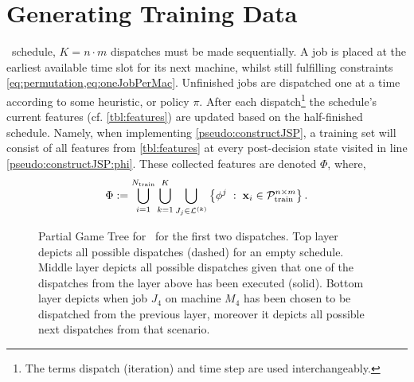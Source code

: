 
\chapter{Generating Training Data}\label{ch:gentrdat} 

 \jsp\ schedule, $K=n\cdot m$ 
dispatches must be made sequentially.
A job is placed at the earliest available time slot for its next machine, 
whilst still fulfilling constraints \cref{eq:permutation,eq:oneJobPerMac}.
Unfinished jobs are dispatched one at a time according to some heuristic, or 
policy $\pi$. 
After each dispatch\footnote{The terms dispatch (iteration) and time step are 
    used interchangeably.} the schedule's current features (cf. 
\cref{tbl:features}) are updated based on the half-finished schedule. Namely, 
when implementing \cref{pseudo:constructJSP}, a training set will consist of 
all features from \cref{tbl:features} at every post-decision state visited in 
line \ref{pseudo:constructJSP:phi}. 
These collected features are denoted $\Phi$, where, 
\begin{equation}\label{eq:Phi}
\Phi:= \bigcup_{i=1}^{N_{\train}} 
\bigcup_{k=1}^K\bigcup_{J_j\in\mathcal{L}^{(k)}} 
\condset{\vphi^j}{\vec{x}_i\in\mathcal{P}^{n\times m}_{\train} }.
\end{equation}

\begin{figure}[p]
    \vspace{-12pt}
    
    \vspace{-27pt}
    \caption[Partial Game Tree for \jsp]{Partial Game Tree for \jsp\ for the 
        first two dispatches. 
        Top layer depicts all possible dispatches (dashed) for an empty 
        schedule. 
        Middle layer depicts all possible dispatches given that one of the 
        dispatches from the layer above has been executed (solid). 
        Bottom layer depicts when job $J_4$ on machine $M_4$ has been chosen to 
        be dispatched from the previous layer, moreover it depicts all possible 
        next dispatches from that scenario.}
    \label{fig:example:gametree}
\end{figure}

